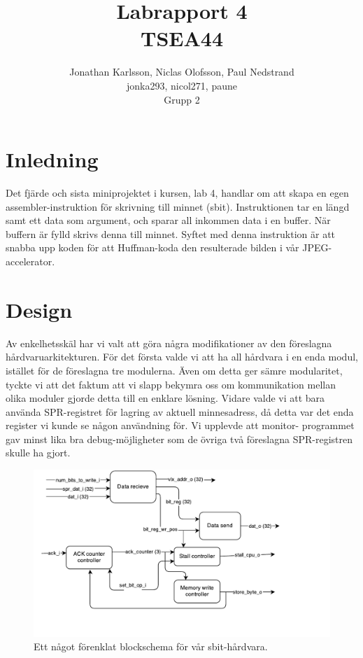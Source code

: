 \documentclass[a4paper]{article}
\author{Jonathan Karlsson, Niclas Olofsson, Paul Nedstrand\\jonka293, nicol271, paune\\Grupp 2}
\title{Labrapport 4\\ \vspace{2 mm} {\large TSEA44}}
\begin{document}
\maketitle
\newpage

\tableofcontents
\newpage

\section{Inledning} Det fjärde och sista miniprojektet i kursen, lab 4,
handlar om att skapa en egen assembler-instruktion för skrivning till
minnet (sbit). Instruktionen tar en längd samt ett data som argument,
och sparar all inkommen data i en buffer. När buffern är fylld skrivs
denna till minnet. Syftet med denna instruktion är att snabba upp koden
för att Huffman-koda den resulterade bilden i vår JPEG-accelerator.\\

\section{Design} Av enkelhetsskäl har vi valt att göra några
modifikationer av den föreslagna hårdvaruarkitekturen. För det första
valde vi att ha all hårdvara i en enda modul, istället för de föreslagna
tre modulerna. Även om detta ger sämre modularitet, tyckte vi att det
faktum att vi slapp bekymra oss om kommunikation mellan olika moduler
gjorde detta till en enklare lösning. Vidare valde vi att bara använda
SPR-registret för lagring av aktuell minnesadress, då detta var det enda
register vi kunde se någon användning för. Vi upplevde att monitor-
programmet gav minst lika bra debug-möjligheter som de övriga två
föreslagna SPR-registren skulle ha gjort.\\

\begin{figure}[H]
\centering
\includegraphics[width=1.0\textwidth]{blockschema.pdf}
\caption{Ett något förenklat blockschema för vår sbit-hårdvara.}
\label{fig:blockschema}
\end{figure}
\end{document}

